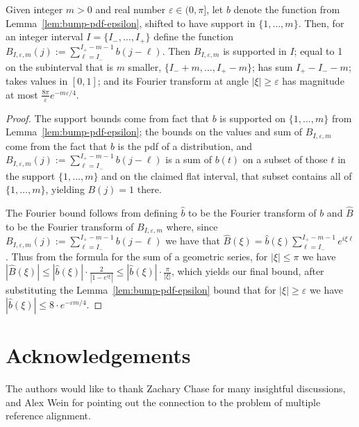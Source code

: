 \documentclass[11pt]{article}
\theoremstyle{plain}
\newcommand{\eps}{\varepsilon}
\begin{document}
\begin{lemma}\label{lem:cumulative-epsilon}
Given integer $m>0$ and real number $\eps\in(0,\pi]$, let $b$ denote the function from Lemma~\ref{lem:bump-pdf-epsilon}, shifted to have support in $\{1,\ldots,m\}$. Then, for an integer interval $I=\{I_-,\ldots,I_+\}$ define the function $B_{I,\eps,m}(j):=\sum_{\ell=I_-}^{I_+-m-1} b(j-\ell)$. Then $B_{I,\eps,m}$ is supported in $I$; equal to 1 on the subinterval that is $m$ smaller, $\{I_-+m,\ldots,I_+-m\}$; has sum $I_+-I_- -m$; takes values in $[0,1]$; and its Fourier transform at angle $|\xi|\geq \eps$ has magnitude at most $\frac{8\pi}{\eps} e^{-m\eps/4}$.
\end{lemma}
\begin{proof}
The support bounds come from fact that $b$ is supported on $\{1,\ldots,m\}$ from Lemma~\ref{lem:bump-pdf-epsilon}; the bounds on the values and sum of $B_{I,\eps,m}$ come from the fact that $b$ is the pdf of a distribution, and $B_{I,\eps,m}(j):=\sum_{\ell=I_-}^{I_+-m-1} b(j-\ell)$ is a sum of $b(t)$ on a subset of those $t$ in the support $\{1,\ldots,m\}$ and on the claimed flat interval, that subset contains all of $\{1,\ldots,m\}$, yielding $B(j)=1$ there.

The Fourier bound follows from defining $\widehat{b}$ to be the Fourier transform of $b$ and $\widehat{B}$ to be the Fourier transform of $B_{I,\eps,m}$ where, since $B_{I,\eps,m}(j):=\sum_{\ell=I_-}^{I_+-m-1} b(j-\ell)$ we have that $\widehat{B}(\xi)=\widehat{b}(\xi)\sum_{\ell=I_-}^{I_+-m-1} e^{i\xi \ell}$. Thus from the formula for the sum of a geometric series, for $|\xi|\leq \pi$ we have $|\widehat{B}(\xi)|\leq|\widehat{b}(\xi)|\cdot\frac{2}{|1-e^{i\xi}|}\leq |\widehat{b}(\xi)|\cdot\frac{\pi}{|\xi|}$, which yields our final bound, after substituting the Lemma~\ref{lem:bump-pdf-epsilon} bound that for $|\xi|\geq \eps$ we have $|\widehat{b}(\xi)|\leq 8\cdot e^{-\eps m/4}$.
\end{proof}

\section*{Acknowledgements}
The authors would like to thank Zachary Chase for many insightful discussions, and Alex Wein for pointing out the connection to the problem of multiple reference alignment.


\end{document}
